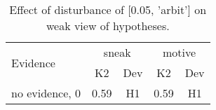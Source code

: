\begin{table}\begin{tabular}{l|cc|cc}\toprule\multirow{2}{*}{Evidence} & \multicolumn{2}{c}{sneak}& \multicolumn{2}{c}{motive}\\& {K2} & {Dev}& {K2} & {Dev}\\\midrule
no evidence, 0 & \cellcolor{Bittersweet}0.59&\cellcolor{Bittersweet}H1&\cellcolor{Bittersweet}0.59&\cellcolor{Bittersweet}H1\\\bottomrule\end{tabular}\caption{Effect of disturbance of [0.05, 'arbit'] on weak view of hypotheses.}\end{table}